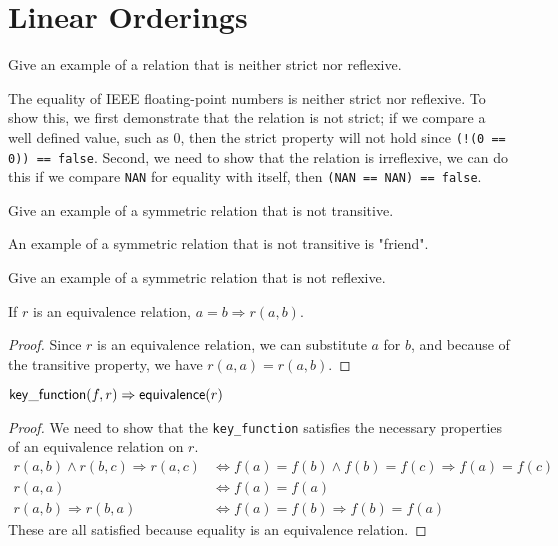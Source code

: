 \chapter{Linear Orderings}

\begin{exercise}
	Give an example of a relation that is neither strict nor reflexive.
\end{exercise}

\begin{solution}
	The equality of IEEE floating-point numbers is neither strict nor reflexive. To show this, we first
	demonstrate that the relation is not strict; if we compare a well defined value, such as 0, then
	the strict property will not hold since \verb|(!(0 == 0)) == false|. Second, we need to show that
	the relation is irreflexive, we can do this if we compare \verb|NAN| for equality with itself, then
	\verb|(NAN == NAN) == false|.
\end{solution}

\begin{exercise}
	Give an example of a symmetric relation that is not transitive.
\end{exercise}

\begin{solution}
	An example of a symmetric relation that is not transitive is "friend".
\end{solution}

\begin{exercise}
	Give an example of a symmetric relation that is not reflexive.
\end{exercise}

\begin{lemma}
	If $r$ is an equivalence relation, $a = b \Rightarrow r(a, b)$.
\end{lemma}

\begin{proof}
	Since $r$ is an equivalence relation, we can substitute $a$ for $b$, and
	because of the transitive property, we have $r(a, a) = r(a, b)$.
\end{proof}

\begin{lemma}
	$\mathsf{key\_function}(f, r) \Rightarrow \mathsf{equivalence}(r)$
\end{lemma}

\begin{proof}
	We need to show that the \verb|key_function| satisfies the necessary properties
	of an equivalence relation on $r$.
	\begin{align*}
		r(a, b) \wedge r(b, c) \Rightarrow r(a, c)
		&\Leftrightarrow f(a) = f(b) \wedge f(b) = f(c) \Rightarrow f(a) = f(c)\\
		r(a, a)
		&\Leftrightarrow f(a) = f(a)\\
		r(a, b) \Rightarrow r(b, a)
		&\Leftrightarrow f(a) = f(b) \Rightarrow f(b) = f(a)
	\end{align*}
	These are all satisfied because equality is an equivalence relation.
\end{proof}

